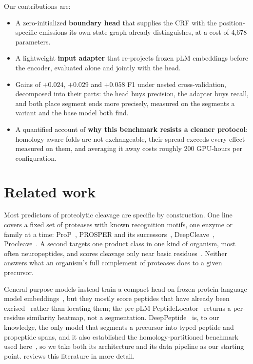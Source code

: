 \documentclass{article}
\begin{document}
Our contributions are:
\begin{itemize}\setlength{\itemsep}{1pt}\setlength{\parskip}{0pt}
  \item A zero-initialized \textbf{boundary head} that supplies the CRF with the position-specific emissions its own state graph already distinguishes, at a cost of 4{,}678 parameters.
  \item A lightweight \textbf{input adapter} that re-projects frozen pLM embeddings before the encoder, evaluated alone and jointly with the head.
  \item Gains of $+0.024$, $+0.029$ and $+0.058$ F1 under nested cross-validation, decomposed into their parts: the head buys precision, the adapter buys recall, and both place segment ends more precisely, measured on the segments a variant and the base model both find.
  \item A quantified account of \textbf{why this benchmark resists a cleaner protocol}: homology-aware folds are not exchangeable, their spread exceeds every effect measured on them, and averaging it away costs roughly 200 GPU-hours per configuration.
\end{itemize}


\section{Related work}
\label{sec:related}

Most predictors of proteolytic cleavage are specific by construction. One line covers a fixed set of proteases with known recognition motifs, one enzyme or family at a time: ProP~\citep{duckert2004prop}, PROSPER and its successors~\citep{song2012prosper,li2023prosperousplus}, DeepCleave~\citep{li2020deepcleave}, Procleave~\citep{li2020procleave}. A second targets one product class in one kind of organism, most often neuropeptides, and scores cleavage only near basic residues~\citep{southey2006neuropred,wang2024deepneuropepred}. Neither answers what an organism's full complement of proteases does to a given precursor.

General-purpose models instead train a compact head on frozen protein-language-model embeddings~\citep{lin2023esm2,esm_cambrian_blog_2024}, but they mostly score peptides that have already been excised~\citep{du2024plm4ace,bpfun2025} rather than locating them; the pre-pLM PeptideLocator~\citep{mooney2013peptidelocator} returns a per-residue similarity heatmap, not a segmentation. DeepPeptide~\citep{deeppeptide2023} is, to our knowledge, the only model that segments a precursor into typed peptide and propeptide spans, and it also established the homology-partitioned benchmark used here~\citep{graphpart2023}, so we take both its architecture and its data pipeline as our starting point.  reviews this literature in more detail.
\end{document}
